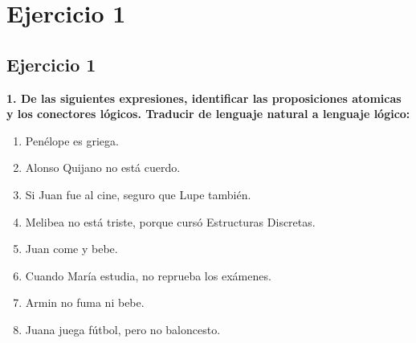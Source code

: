
\chapter*{Ejercicio 1}
\section*{Ejercicio 1}
\noindent\textbf{1. De las siguientes expresiones, identificar las proposiciones atomicas y los conectores lógicos. Traducir de lenguaje natural a lenguaje lógico:}

\begin{multicols}{2}
	\begin{enumerate}[label=\alph*)]
		\item Penélope es griega.
		\item Alonso Quijano no está cuerdo.
		\item Si Juan fue al cine, seguro que Lupe también.
		\item Melibea no está triste, porque cursó Estructuras Discretas.
		\item Juan come y bebe.
		\item Cuando María estudia, no reprueba los exámenes.
		\item Armin no fuma ni bebe.
		\item Juana juega fútbol, pero no baloncesto.
	\end{enumerate}
\end{multicols}

